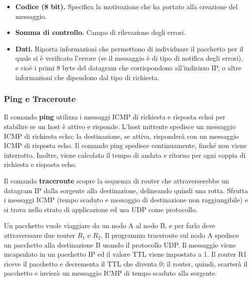 \begin{itemize}
            \item 
                \textbf{Codice (8 bit).} Specifica la motivazione che ha portato alla creazione del messaggio.
                
            \item
                \textbf{Somma di controllo.} Campo di rilevazione degli errori.
                
            \item
                \textbf{Dati.} Riporta informazioni che permettono di individuare il pacchetto per il quale si è verificato l'errore (se il messaggio è di tipo di notifica degli errori), e cioè i primi 8 byte del datagram che corrispondono all'indirizzo IP, o altre informazioni che dipendono dal tipo di richiesta.

        \end{itemize}
        
        \subsubsection{Ping e Traceroute}
        
            Il comando \textbf{ping} utilizza i messaggi ICMP di richiesta e risposta echoi per stabilire se un host è attivo e risponde. L'host mittente spedisce un messaggio ICMP di richiesta echo; la destinazione, se attiva, risponderà con un messaggio ICMP di risposta echo. Il comando ping spedisce continuamente, finché non viene interrotto. Inoltre, viene calcolato il tempo di andata e ritorno per ogni coppia di richiesta e risposta echo.
        
            \vspace{3mm}
        
            Il comando \textbf{traceroute} scopre la sequenza di router che attraverserebbe un datagram IP dalla sorgente alla destinazione, delineando quindi una rotta. Sfrutta i messaggi ICMP (tempo scaduto e messaggio di destinazione non raggiungibile) e si trova nello strato di applicazione ed usa UDP come protocollo.
            
            Un pacchetto vuole viaggiare da un nodo A al nodo B, e per farlo deve attraverssare due router $R_1$ e $R_2$. Il programma traceroute sul nodo A spedisce un pacchetto alla destinazione B usando il protocollo UDP. Il messaggio viene incapsulato in un pacchetto IP ed il valore TTL viene impostato a 1. Il router R1 riceve il pacchetto e decrementa il TTL che diventa 0; il router, quindi, scarterà il pacchetto e invierà un messaggio ICMP di tempo scaduto alla sorgente. 
            
